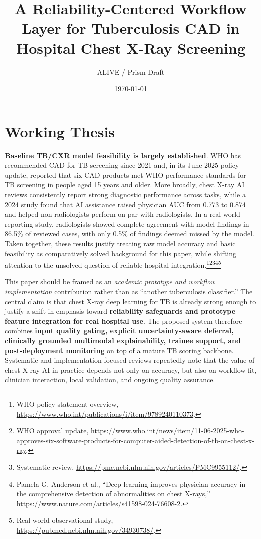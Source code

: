\documentclass[11pt]{article}
\title{A Reliability-Centered Workflow Layer for Tuberculosis CAD in Hospital Chest X-Ray Screening}
\author{ALIVE / Prism Draft}
\date{\today}
\begin{document}
\maketitle

\section{Working Thesis}

\textbf{Baseline TB/CXR model feasibility is largely established}. WHO has recommended CAD for TB screening since 2021 and, in its June 2025 policy update, reported that six CAD products met WHO performance standards for TB screening in people aged 15 years and older. More broadly, chest X-ray AI reviews consistently report strong diagnostic performance across tasks, while a 2024 study found that AI assistance raised physician AUC from 0.773 to 0.874 and helped non-radiologists perform on par with radiologists. In a real-world reporting study, radiologists showed complete agreement with model findings in 86.5\% of reviewed cases, with only 0.5\% of findings deemed missed by the model. Taken together, these results justify treating raw model accuracy and basic feasibility as comparatively solved background for this paper, while shifting attention to the unsolved question of reliable hospital integration.\footnote{WHO policy statement overview, \url{https://www.who.int/publications/i/item/9789240110373}.}\footnote{WHO approval update, \url{https://www.who.int/news/item/11-06-2025-who-approves-six-software-products-for-computer-aided-detection-of-tb-on-chest-x-ray}.}\footnote{Systematic review, \url{https://pmc.ncbi.nlm.nih.gov/articles/PMC9955112/}.}\footnote{Pamela G. Anderson et al., ``Deep learning improves physician accuracy in the comprehensive detection of abnormalities on chest X-rays,'' \url{https://www.nature.com/articles/s41598-024-76608-2}.}\footnote{Real-world observational study, \url{https://pubmed.ncbi.nlm.nih.gov/34930738/}.}


This paper should be framed as an \emph{academic prototype and workflow implementation} contribution rather than as ``another tuberculosis classifier.'' The central claim is that chest X-ray deep learning for TB is already strong enough to justify a shift in emphasis toward \textbf{reliability safeguards and prototype feature integration for real hospital use}. The proposed system therefore combines \textbf{input quality gating, explicit uncertainty-aware deferral, clinically grounded multimodal explainability, trainee support, and post-deployment monitoring} on top of a mature TB scoring backbone. Systematic and implementation-focused reviews repeatedly note that the value of chest X-ray AI in practice depends not only on accuracy, but also on workflow fit, clinician interaction, local validation, and ongoing quality assurance.
\end{document}
